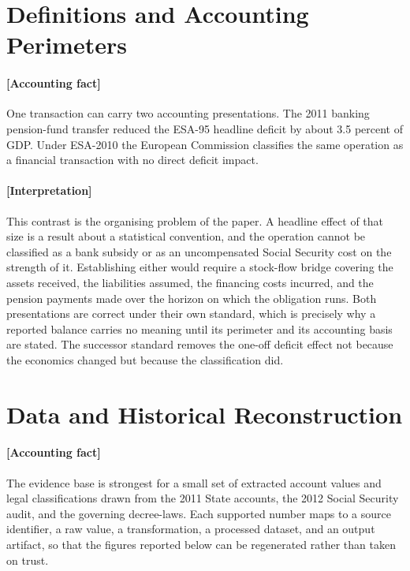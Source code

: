 \documentclass[11pt]{article}
\begin{document}
\section{Definitions and Accounting Perimeters}
\label{sec:definitions}
\paragraph{[Accounting fact]}
One transaction can carry two accounting presentations. The 2011 banking pension-fund transfer reduced the ESA-95 headline deficit by about 3.5 percent of GDP. Under ESA-2010 the European Commission classifies the same operation as a financial transaction with no direct deficit impact.

\paragraph{[Interpretation]}
This contrast is the organising problem of the paper. A headline effect of that size is a result about a statistical convention, and the operation cannot be classified as a bank subsidy or as an uncompensated Social Security cost on the strength of it. Establishing either would require a stock-flow bridge covering the assets received, the liabilities assumed, the financing costs incurred, and the pension payments made over the horizon on which the obligation runs. Both presentations are correct under their own standard, which is precisely why a reported balance carries no meaning until its perimeter and its accounting basis are stated. The successor standard removes the one-off deficit effect not because the economics changed but because the classification did.

\section{Data and Historical Reconstruction}
\label{sec:data}
\paragraph{[Accounting fact]}
The evidence base is strongest for a small set of extracted account values and legal classifications drawn from the 2011 State accounts, the 2012 Social Security audit, and the governing decree-laws. Each supported number maps to a source identifier, a raw value, a transformation, a processed dataset, and an output artifact, so that the figures reported below can be regenerated rather than taken on trust.
\end{document}
